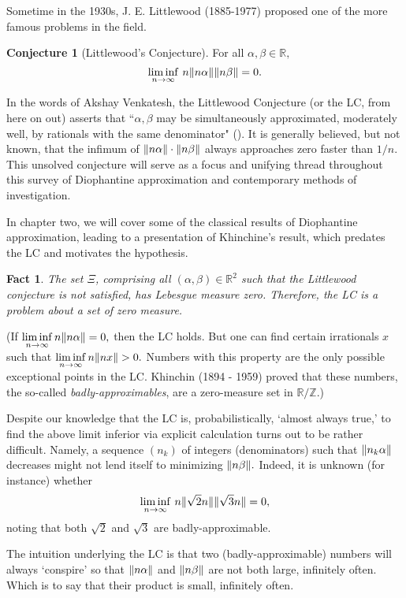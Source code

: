 \documentclass[12pt, letterpaper, oneside]{book}
\newcommand{\ga}{\ensuremath{\alpha}}
\newcommand{\gb}{\ensuremath{\beta}}
\newcommand{\R}{\mathbb{R}}
\newcommand{\Z}{\mathbb{Z}}
\DeclarePairedDelimiter{\norm}{\lVert}{\rVert}
\theoremstyle{plain}
\newtheorem{fact}{Fact}
\theoremstyle{definition}
\newtheorem{conjecture}{Conjecture}
\theoremstyle{remark}
\begin{document}
Sometime in the 1930s, J. E. Littlewood (1885-1977) proposed one of the more famous problems in the field.

\begin{conjecture}[Littlewood's Conjecture]\label{LC}
  For all $\alpha, \beta \in \R,$
  \[
  \liminf\limits_{n \to \infty}\,n \norm{n \ga} \norm{n \gb}  = 0.
  \]
\end{conjecture} 
In the words of Akshay Venkatesh, the Littlewood Conjecture (or the LC, from here on out) asserts that ``$\ga, \gb$ may be simultaneously approximated, moderately well, by rationals with the same denominator" (\cite{Ven08}). It is generally believed, but not known, that the infimum of $\norm{n \ga} \cdot \norm{n \gb}$ always approaches zero faster than $1/n.$ This unsolved conjecture will serve as a focus and unifying thread throughout this survey of Diophantine approximation and contemporary methods of investigation.

In chapter two, we will cover some of the classical results of Diophantine approximation, leading to a presentation of Khinchine's result, which predates the LC and motivates the hypothesis. 

\begin{fact}
The set $\Xi$, comprising all $(\ga , \gb) \in \R^2$ such that the Littlewood conjecture is not satisfied, has Lebesgue measure zero. Therefore, the LC is a problem about a set of zero measure. 
\end{fact}

(If $\liminf \limits_{n \to \infty} n \norm{n\ga} = 0,$ then the LC holds. But one can find certain irrationals $x$ such that $\liminf\limits_{n \to \infty} n\norm{nx} > 0.$ Numbers with this property are the only possible exceptional points in the LC. Khinchin (1894 - 1959) proved that these numbers, the so-called \textit{badly-approximables}, are a zero-measure set in $\R/\Z.$)

Despite our knowledge that the LC is, probabilistically, `almost always true,' to find the above limit inferior via explicit calculation turns out to be rather difficult. Namely, a sequence $(n_k)$ of integers (denominators) such that $\norm{n_k\ga}$ decreases might not lend itself to minimizing $\norm{n\gb}.$ Indeed, it is unknown (for instance) whether 
  \[
  \liminf\limits_{n \to \infty}\,n \norm{\sqrt{2} n} \norm{\sqrt{3} n}  = 0,
  \]
noting that both $\sqrt{2}$ and $\sqrt{3}$ are badly-approximable. 


The intuition underlying the LC is that two (badly-approximable) numbers will always `conspire' so that $\norm{n\ga}$ and $\norm{n\gb}$ are not both large, infinitely often. Which is to say that their product is small, infinitely often. 
\end{document}
